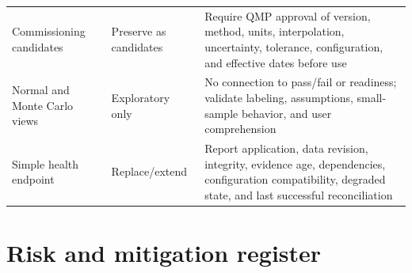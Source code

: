 \documentclass[11pt,letterpaper]{article}
\begin{document}
\begin{small}
\begin{longtable}{@{}L{0.25\textwidth}L{0.18\textwidth}L{0.45\textwidth}@{}}
\addlinespace[2pt]
Commissioning candidates & Preserve as candidates & Require QMP approval of version, method, units, interpolation, uncertainty, tolerance, configuration, and effective dates before use \\
\addlinespace[2pt]
Normal and Monte Carlo views & Exploratory only & No connection to pass/fail or readiness; validate labeling, assumptions, small-sample behavior, and user comprehension \\
\addlinespace[2pt]
Simple health endpoint & Replace/extend & Report application, data revision, integrity, evidence age, dependencies, configuration compatibility, degraded state, and last successful reconciliation \\
\end{longtable}
\end{small}

\section{Risk and mitigation register}
\end{document}

